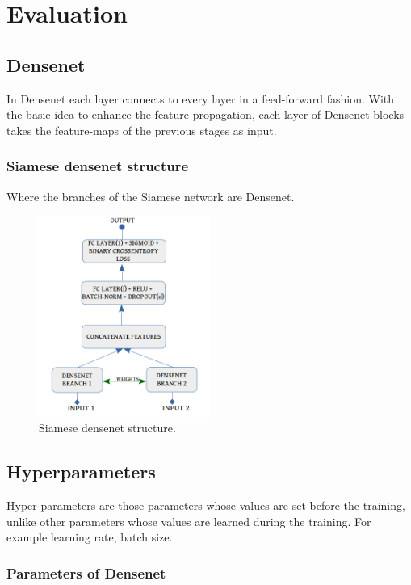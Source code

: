 
\chapter{Evaluation}

\section{Densenet}

In Densenet each layer connects to every layer in a feed-forward fashion. 
With the basic idea to enhance the feature propagation, each layer of Densenet blocks takes the feature-maps of the previous stages as input.  


\subsection{Siamese densenet structure}

Where the branches of the Siamese network are Densenet. 
\begin{figure}[h]
\centering
\includegraphics[width=0.5\textwidth]{images/densenet/siamese_densenet_structure.png}
\caption{\label{fig:dn_siamese}Siamese densenet structure.}
\end{figure}

\section{Hyperparameters}
Hyper-parameters are those parameters whose values are set before the training, unlike other parameters whose values are learned during the training. 
For example learning rate, batch size. \cite{wikihyper}
\subsection{Parameters of Densenet}
